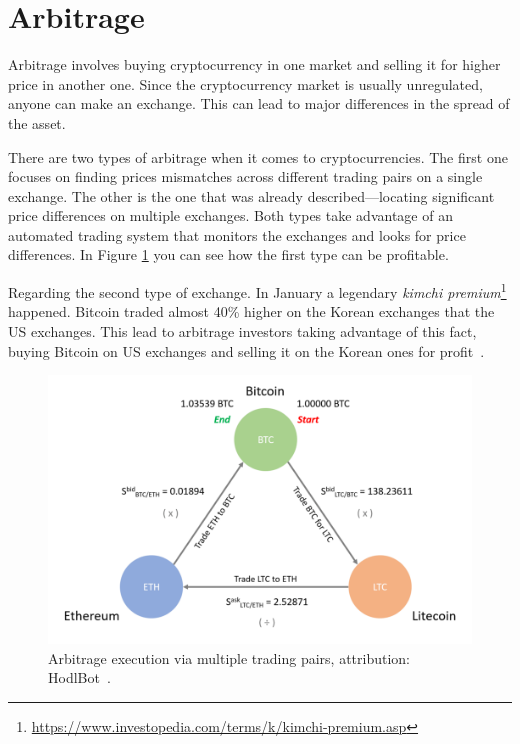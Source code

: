 \section{Arbitrage}
Arbitrage involves buying cryptocurrency in one market and selling it for higher price in another one. Since the cryptocurrency market is usually unregulated, anyone can make an exchange. This can lead to major differences in the spread of the asset.

There are two types of arbitrage when it comes to cryptocurrencies. The first one focuses on finding prices mismatches across different trading pairs on a single exchange. The other is the one that was already described---locating significant price differences on multiple exchanges. Both types take advantage of an automated trading system that monitors the exchanges and looks for price differences. In Figure \ref{arbitrage-figure} you can see how the first type can be profitable.

Regarding the second type of exchange. In January a legendary \emph{kimchi premium}\footnote{\url{https://www.investopedia.com/terms/k/kimchi-premium.asp}} happened. Bitcoin traded almost 40\% higher on the Korean exchanges that the US exchanges. This lead to arbitrage investors taking advantage of this fact, buying Bitcoin on US exchanges and selling it on the Korean ones for profit~\cite{hodlbot:day-trading-cryptocurrency}.

\begin{figure}[!hbt]
    \centering
    \includegraphics[width=\columnwidth]{figures/arbitrage.png}
    \caption{Arbitrage execution via multiple trading pairs, attribution: HodlBot~\cite{hodlbot:day-trading-cryptocurrency}.}
    \label{arbitrage-figure}
\end{figure}

